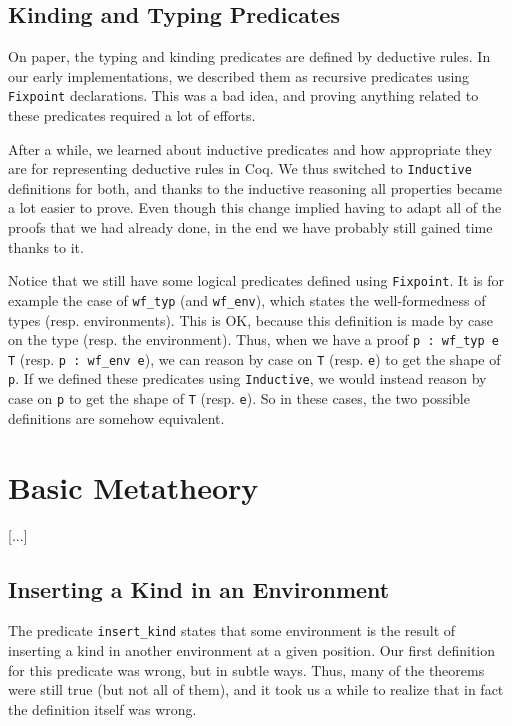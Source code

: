 \documentclass[a4paper,11pt]{article}
\begin{document}
\subsection*{Kinding and Typing Predicates}

On paper, the typing and kinding predicates are defined by deductive
rules. In our early implementations, we described them as recursive
predicates using \verb|Fixpoint| declarations. This was a bad idea,
and proving anything related to these predicates required a lot
of efforts.

After a while, we learned about inductive predicates and how
appropriate they are for representing deductive rules in Coq. We thus
switched to \verb|Inductive| definitions for both, and thanks to the
inductive reasoning all properties became a lot easier to prove. Even
though this change implied having to adapt all of the proofs that we
had already done, in the end we have probably still gained time thanks
to it.

Notice that we still have some logical predicates defined using
\verb|Fixpoint|. It is for example the case of \verb|wf_typ| (and
\verb|wf_env|), which states the well-formedness of types
(resp. environments). This is OK, because this definition is made
by case on the type (resp. the environment). Thus, when we have a
proof \verb|p : wf_typ e T| (resp. \verb|p : wf_env e|),
we can reason by case on \verb|T| (resp. \verb|e|) to get the
shape of \verb|p|. If we defined these predicates using
\verb|Inductive|, we would instead reason by case on \verb|p| to get
the shape of \verb|T| (resp. \verb|e|). So in these cases, the two
possible definitions are somehow equivalent.

\section{Basic Metatheory}

[...]

\subsection*{Inserting a Kind in an Environment}

The predicate \verb|insert_kind| states that some environment is the
result of inserting a kind in another environment at a given position.
Our first definition for this predicate was wrong, but in subtle
ways. Thus, many of the theorems were still true (but not all of
them), and it took us a while to realize that in fact the definition
itself was wrong.
\end{document}
